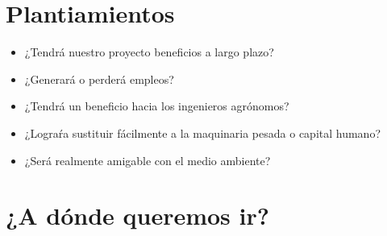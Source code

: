 \documentclass[11pt,a4paper]{article}
\begin{document}
\section{Plantiamientos}

\begin{itemize}

\item ¿Tendrá nuestro proyecto beneficios a largo plazo?\\
\item ¿Generará o perderá empleos?\\
\item ¿Tendrá un beneficio hacia los ingenieros agrónomos?\\
\item ¿Lograŕa sustituir fácilmente a la maquinaria pesada o capital humano?\\
\item ¿Será realmente amigable con el medio ambiente?\\
\end{itemize} 

\section{¿A dónde queremos ir?}
\end{document}
